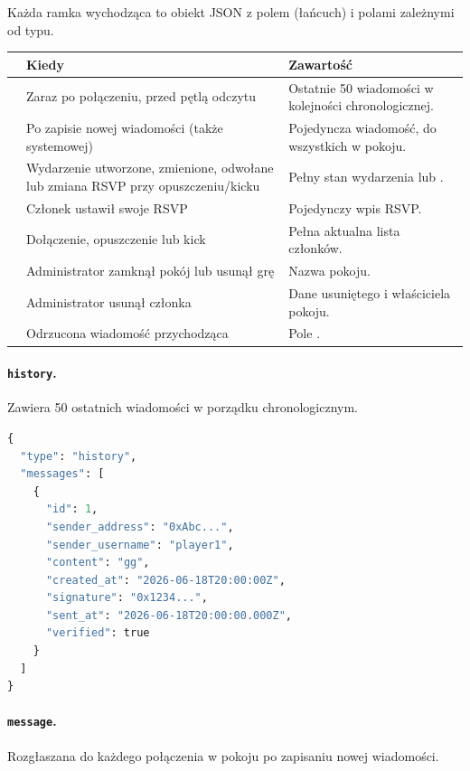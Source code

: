 Każda ramka wychodząca to obiekt JSON z polem  (łańcuch) i polami zależnymi od typu.

\begin{tabularx}{\textwidth}{l>{\raggedright\arraybackslash}p{}Y}
\toprule
{} & Kiedy & Zawartość \\
\midrule
{} & Zaraz po połączeniu, przed pętlą odczytu & Ostatnie 50 wiadomości w kolejności chronologicznej. \\
 & Po zapisie nowej wiadomości (także systemowej) & Pojedyncza wiadomość, do wszystkich w pokoju. \\
 & Wydarzenie utworzone, zmienione, odwołane lub zmiana RSVP przy opuszczeniu/kicku & Pełny stan wydarzenia lub . \\
 & Członek ustawił swoje RSVP & Pojedynczy wpis RSVP. \\
 & Dołączenie, opuszczenie lub kick & Pełna aktualna lista członków. \\
 & Administrator zamknął pokój lub usunął grę & Nazwa pokoju. \\
 & Administrator usunął członka & Dane usuniętego i właściciela pokoju. \\
 & Odrzucona wiadomość przychodząca & Pole . \\
\bottomrule
\end{tabularx}

\paragraph{\texttt{history}.} Zawiera 50 ostatnich wiadomości w porządku chronologicznym.

\begin{lstlisting}[language=Python]
{
  "type": "history",
  "messages": [
    {
      "id": 1,
      "sender_address": "0xAbc...",
      "sender_username": "player1",
      "content": "gg",
      "created_at": "2026-06-18T20:00:00Z",
      "signature": "0x1234...",
      "sent_at": "2026-06-18T20:00:00.000Z",
      "verified": true
    }
  ]
}
\end{lstlisting}

\paragraph{\texttt{message}.} Rozgłaszana do każdego połączenia w pokoju po zapisaniu nowej wiadomości.

